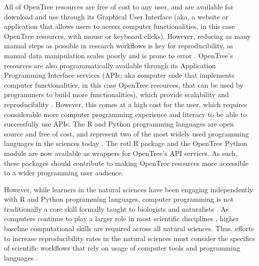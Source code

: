 \documentclass[12pt]{article}
\begin{document}
All of OpenTree resources
are free of cost to any user, and are available for download and use through its Graphical User
Interface (aka, a website or application that allows users to access computer functionalities, in this case OpenTree resources, with mouse or keyboard clicks).
However, reducing as many manual steps as possible in research workflows is key
for reproducibility, as manual data manipulation scales poorly and is prone to
error \citep{bakken2019journey}.
OpenTree's resources are also programmatically available through its Application
Programming Interface services (APIs; aka computer code that implements computer functionalities,
in this case OpenTree resources, that can be used by programmers
to build more functionalities),
which provide scalability and reproducibility \citep{opentreeAPIv3}.
However, this comes at a high cost for the user, which requires considerable more
computer programming experience and literacy to be able to successfully use APIs.
The R and Python programming languages are open source and free of cost, and represent
two of the most widely used programming languages in the sciences today \citep{baker2017scientific}.
The rotl R package \citep{michonneau2016rotl} and the OpenTree Python module
\citep{mctavish2021opentree} are now available as wrappers for OpenTree's API services.
As such, these packages should contribute to making OpenTree resources more accessible
to a wider programming user audience.

However, while learners in the natural sciences have been engaging independently
with R and Python programming languages, computer programming is not traditionally
a core skill formally taught to biologists and naturalists
\citep{sayres2018bioinformatics, wright2019the, williams2019barriers}.
As computers continue to play a larger role in most scientific disciplines \citep{piccolo2016tools},
higher baseline computational skills are required across all natural sciences.
Thus, efforts to increase reproducibility rates in the natural sciences must consider
the specifics of scientific workflows that rely on usage of computer tools and
programming languages \citep{peng2011reproducible, sandve2013ten, powers2019open}.
\end{document}
